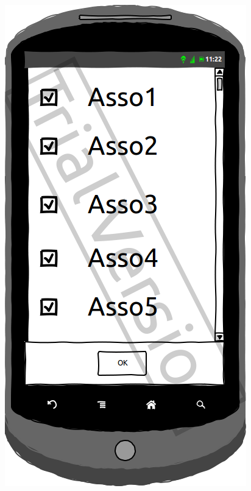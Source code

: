 \documentclass[a4paper, 11px]{article}
\begin{document}
\begin{figure}[htbp]
\begin{minipage}[c]{.33\linewidth}
		\begin{center}
			\includegraphics[scale=0.3]{../../Sketch/Android/Filtre.png}
		\end{center}
	\end{minipage}
	\hfill
	\begin{minipage}[c]{.32\linewidth}
		\begin{center}

\end{center}
\end{minipage}
\end{figure}
\end{document}
